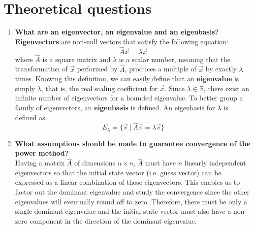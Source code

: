\documentclass[unicode,11pt,a4paper,oneside,numbers=endperiod,openany]{scrartcl}
\begin{document}
\setassignment
{}

\newline

\section{Theoretical questions }

\begin{enumerate}
  \item[(a)] \textbf{What are an eigenvector, an eigenvalue and an eigenbasis?}
  \\[.5em]
  \textbf{Eigenvectors} are non-null vectors that satisfy the following equation:
  $$
  \hat{A}\vec{x} = \lambda\vec{x}
  $$
  where $\hat{A}$ is a square matrix and $\lambda$ is a scalar number, meaning that the transformation of $\vec{x}$ performed by $\hat{A}$, produces a multiple of $\vec{x}$ by exactly $\lambda$ times. Knowing this definition, we can easily define that an \textbf{eigenvalue} is simply $\lambda$, that is, the real scaling coefficient for $\vec{x}$. Since $\lambda \in \mathbb{R}$, there exist an infinite number of eigenvectors for a bounded eigenvalue. To better group a family of eigenvectors, an \textbf{eigenbasis} is defined. An eigenbasis for $\lambda$ is defined as:
  $$
  E_{\lambda} = \{ \vec{v} ~ | ~ \hat{A}\vec{v} = \lambda \vec{v} \}
  $$
  
  \item[(b)] \textbf{What assumptions should be made to guarantee convergence of the power method?}
  \\[.5em]
  Having a matrix $\hat{A}$ of dimensions $n \times n$, $\hat{A}$ must have $n$ linearly independent eigenvectors so that the initial state vector (i.e. guess vector) can be expressed as a linear combination of those eigenvectors. This enables us to factor out the dominant eigenvalue and study the convergence since the other eigenvalues will eventually round off to zero. Therefore, there must be only a single dominant eigenvalue and the initial state vector must also have a non-zero component in the direction of the dominant eigenvalue.
  

\end{enumerate}
\end{document}
